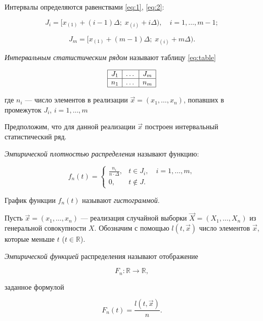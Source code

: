 Интервалы определяются равенствами \ref{eq:1}, \ref{eq:2}:

\begin{equation}\label{eq:1}
	J_i = [x_{(1)} + (i - 1) \Delta; \; x_{(i)} + i \Delta), \quad i = 1, \dots, m-1;
\end{equation}

\begin{equation}\label{eq:2}
	J_m = [x_{(1)} + (m - 1) \Delta; \; x_{(i)} + m \Delta).
\end{equation}

\textit{Интервальным статистическим рядом} называют таблицу \ref{eq:table}

\begin{equation}\label{eq:table}
	\begin{array}{|c|c|c|}
		\hline
		J_1 & \text{\dots} & J_m \\
		\hline
		n_1 & \text{\dots} & n_m \\
		\hline
	\end{array}
\end{equation}

где $n_i$ --- число элементов в реализации $\vec{x} = (x_1, \dots, x_n)$, попавших в промежуток $J_i$, $i = 1, \dots, m$

Предположим, что для данной реализации $\vec{x}$ построен интервальный статистический ряд.

\textit{Эмпирической плотностью распределения} называют функцию:

\begin{equation}\label{eq:empiric_density}
	f_n(t) = \begin{cases}
		\frac{n_i}{n \cdot \Delta}, & t \in J_i, \quad i = 1, \dots, m, \\
		0, & t \notin J.
	\end{cases}
\end{equation}

График функции $f_n(t)$ называют \textit{гистограммой}.

Пусть $\vec{x} = (x_1, \dots, x_n)$ --- реализация случайной выборки $\vec{X} = (X_1, \dots, X_n)$ из генеральной совокупности $X$.
Обозначим с помощью $l(t, \vec{x})$ число элементов $\vec{x}$, которые меньше $t$ ($t \in \mathbb{R}$).

\textit{Эмпирической функцией} распределения называют отображение 

\begin{equation}
	F_n: \mathbb{R} \to \mathbb{R},
\end{equation}

заданное формулой 

\begin{equation}\label{eq:empiric_f}
	F_n(t) = \frac{l(t, \vec{x})}{n}.
\end{equation}